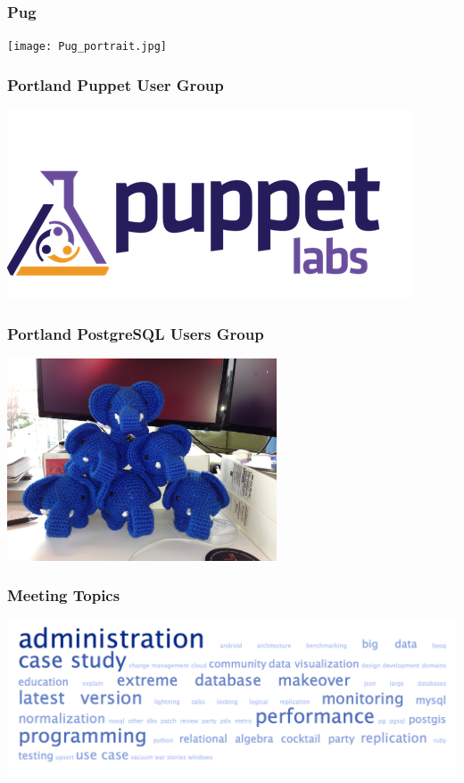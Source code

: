 \documentclass{beamer}
\begin{document}
\frame
{
  \frametitle{Pug}

  \begin{center}
    \texttt{[image: Pug\_portrait.jpg]}
  \end{center}
}

\frame
{
  \frametitle{Portland Puppet User Group}

  \begin{center}
    \includegraphics[width=\textheight]{Puppet_Labs_Logo.png}
  \end{center}
}

\frame
{
  \frametitle{Portland PostgreSQL Users Group}
  \begin{center}
    \includegraphics[width=8cm]{chelnik-pyramid.jpg}
  \end{center}
}

\frame
{
  \frametitle{Meeting Topics}

  \begin{center}
  \includegraphics[width=\textwidth]{tag-cloud.png}
  \end{center}
}
\end{document}
